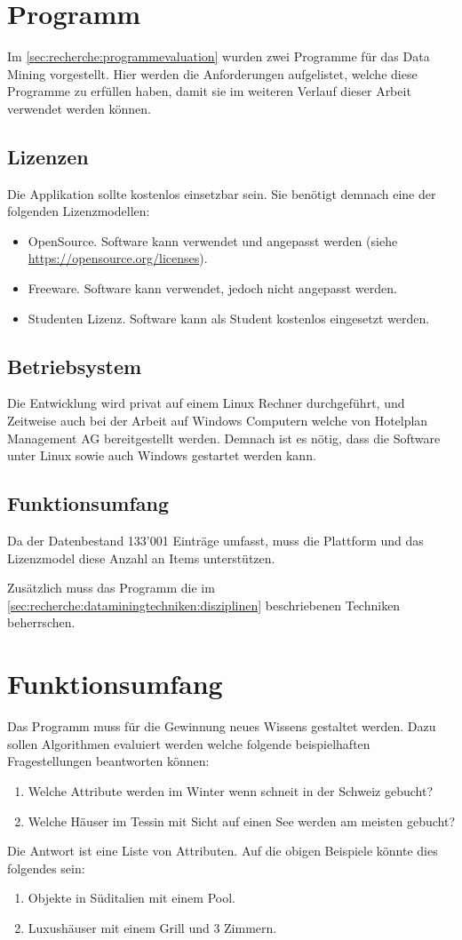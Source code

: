 \section{Programm}
\label{sec:anforderungsanalyse:programm}
Im \cref{sec:recherche:programmevaluation} wurden zwei Programme für das Data Mining vorgestellt. Hier werden die Anforderungen aufgelistet, welche diese Programme zu erfüllen haben, damit sie im weiteren Verlauf dieser Arbeit verwendet werden können.

\subsection{Lizenzen}
\label{sec:anforderungsanalyse:programm:lizenzen}
Die Applikation sollte kostenlos einsetzbar sein. Sie benötigt demnach eine der folgenden Lizenzmodellen:
\begin{itemize}
\item OpenSource. Software kann verwendet und angepasst werden (siehe \url{https://opensource.org/licenses}).
\item Freeware. Software kann verwendet, jedoch nicht angepasst werden.
\item Studenten Lizenz. Software kann als Student kostenlos eingesetzt werden.
\end{itemize}

\subsection{Betriebsystem}
\label{sec:anforderungsanalyse:programm:betriebsystem}
Die Entwicklung wird privat auf einem Linux Rechner durchgeführt, und Zeitweise auch bei der Arbeit auf Windows Computern welche von Hotelplan Management AG bereitgestellt werden.
Demnach ist es nötig, dass die Software unter Linux sowie auch Windows gestartet werden kann.

\subsection{Funktionsumfang}
\label{sec:anforderungsanalyse:programm:funktionsumfang}
Da der Datenbestand 133'001 Einträge umfasst, muss die Plattform und das Lizenzmodel diese Anzahl an Items unterstützen.

Zusätzlich muss das Programm die im \cref{sec:recherche:dataminingtechniken:disziplinen} beschriebenen Techniken beherrschen.

\section{Funktionsumfang}
Das Programm muss für die Gewinnung neues Wissens gestaltet werden. Dazu sollen Algorithmen evaluiert werden welche folgende beispielhaften Fragestellungen beantworten können:
\begin{enumerate}
\item Welche Attribute werden im Winter wenn schneit in der Schweiz gebucht?
\item Welche Häuser im Tessin mit Sicht auf einen See werden am meisten gebucht?
\end{enumerate}

Die Antwort ist eine Liste von Attributen. Auf die obigen Beispiele könnte dies folgendes sein:
\begin{enumerate}
\item Objekte in Süditalien mit einem Pool.
\item Luxushäuser mit einem Grill und 3 Zimmern.
\end{enumerate}
